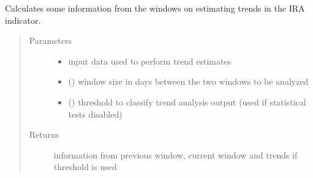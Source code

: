 \documentclass[letterpaper,10pt,english]{sphinxmanual}
\begin{document}

\begin{fulllineitems}
\label{\detokenize{algorithms:algorithms.eti.eti.calc_info_windows_ira}}
\sphinxAtStartPar
Calculates some information from the windows on estimating trends in the IRA indicator.
\begin{quote}\begin{description}
\item[{Parameters}] \leavevmode\begin{itemize}
\item {} 
\sphinxAtStartPar
{} \textendash{} input data used to perform trend estimates

\item {} 
\sphinxAtStartPar
{} () \textendash{} window size in days between the two windows to be analyzed

\item {} 
\sphinxAtStartPar
{} () \textendash{} threshold to classify trend analysis output (used if statistical tests disabled)

\end{itemize}

\item[{Returns}] \leavevmode
\sphinxAtStartPar
information from previous window, current window and trends if threshold is used

\end{description}\end{quote}

\end{fulllineitems}

\end{document}
